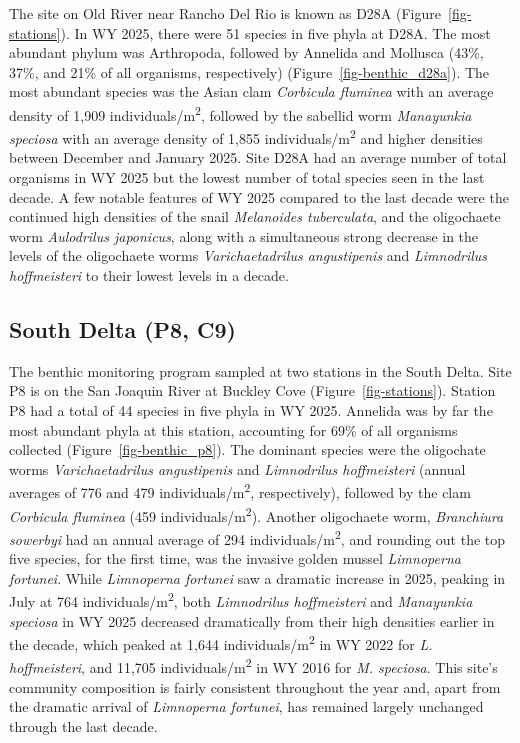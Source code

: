 \documentclass[
  letterpaper,
]{article}
\begin{document}
The site on Old River near Rancho Del Rio is known as D28A
(Figure~\ref{fig-stations}). In WY 2025, there were 51 species in five
phyla at D28A. The most abundant phylum was Arthropoda, followed by
Annelida and Mollusca (43\%, 37\%, and 21\% of all organisms,
respectively) (Figure~\ref{fig-benthic_d28a}). The most abundant species
was the Asian clam \emph{Corbicula fluminea} with an average density of
1,909 individuals/m\textsuperscript{2}, followed by the sabellid worm
\emph{Manayunkia speciosa} with an average density of 1,855
individuals/m\textsuperscript{2} and higher densities between December
and January 2025. Site D28A had an average number of total organisms in
WY 2025 but the lowest number of total species seen in the last decade.
A few notable features of WY 2025 compared to the last decade were the
continued high densities of the snail \emph{Melanoides tuberculata}, and
the oligochaete worm \emph{Aulodrilus japonicus}, along with a
simultaneous strong decrease in the levels of the oligochaete worms
\emph{Varichaetadrilus angustipenis} and \emph{Limnodrilus hoffmeisteri}
to their lowest levels in a decade.

\subsection{South Delta (P8, C9)}\label{south-delta-p8-c9}

The benthic monitoring program sampled at two stations in the South
Delta. Site P8 is on the San Joaquin River at Buckley Cove
(Figure~\ref{fig-stations}). Station P8 had a total of 44 species in
five phyla in WY 2025. Annelida was by far the most abundant phyla at
this station, accounting for 69\% of all organisms collected
(Figure~\ref{fig-benthic_p8}). The dominant species were the oligochate
worms \emph{Varichaetadrilus angustipenis} and \emph{Limnodrilus
hoffmeisteri} (annual averages of 776 and 479
individuals/m\textsuperscript{2}, respectively), followed by the clam
\emph{Corbicula fluminea} (459 individuals/m\textsuperscript{2}).
Another oligochaete worm, \emph{Branchiura sowerbyi} had an annual
average of 294 individuals/m\textsuperscript{2}, and rounding out the
top five species, for the first time, was the invasive golden mussel
\emph{Limnoperna fortunei}. While \emph{Limnoperna fortunei} saw a
dramatic increase in 2025, peaking in July at 764
individuals/m\textsuperscript{2}, both \emph{Limnodrilus hoffmeisteri}
and \emph{Manayunkia speciosa} in WY 2025 decreased dramatically from
their high densities earlier in the decade, which peaked at 1,644
individuals/m\textsuperscript{2} in WY 2022 for \emph{L. hoffmeisteri},
and 11,705 individuals/m\textsuperscript{2} in WY 2016 for \emph{M.
speciosa}. This site's community composition is fairly consistent
throughout the year and, apart from the dramatic arrival of
\emph{Limnoperna fortunei}, has remained largely unchanged through the
last decade.
\end{document}
